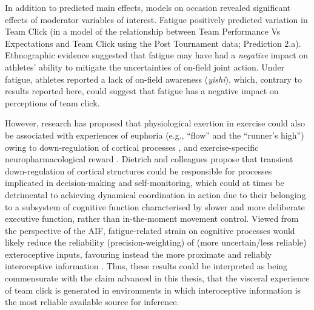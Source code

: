 \begin{CJK}{UTF8}{gbsn}

In addition to predicted main effects, models on occasion revealed significant effects of moderator variables of interest.  Fatigue positively predicted variation in Team Click (in a model of the relationship between Team Performance Vs Expectations and Team Click using the Post Tournament data; Prediction 2.a).  Ethnographic evidence suggested that fatigue may have had a \textit{negative} impact on athletes' ability to mitigate the uncertainties of on-field joint action.  Under fatigue, athletes reported a lack of on-field awareness (\textit{yishi}), which, contrary to results reported here, could suggest that fatigue has a negative impact on perceptions of team click.

However, research has proposed that physiological exertion in exercise could also be associated with experiences of euphoria (e.g., ``flow'' and the ``runner's high'') owing to down-regulation of cortical processes \citep{Dietrich2011}, and exercise-specific neuropharmacological reward \citep{Raichlen2013}.  Dietrich and colleagues propose that transient down-regulation of cortical structures could be responsible for processes implicated in decision-making and self-monitoring, which could at times be detrimental to achieving dynamical coordination in action due to their belonging to a subsystem of cognitive function \citep[i.e., a deliberate ``system 2'' as opposed to more automatic and implicit ``system 1''; see ][]{Kahneman2011} characterised by slower and more deliberate executive function, rather than in-the-moment movement control.  Viewed from the perspective of the AIF, fatigue-related strain on cognitive processes would likely reduce the reliability (precision-weighting) of (more uncertain/less reliable) exteroceptive inputs, favouring instead the more proximate and reliably interoceptive information \citep{Pezzulo2014}.  Thus, these results could be interpreted as being commensurate with the claim advanced in this thesis, that the visceral experience of team click is generated in environments in which interoceptive information is the most reliable available source for inference.


\end{CJK}
